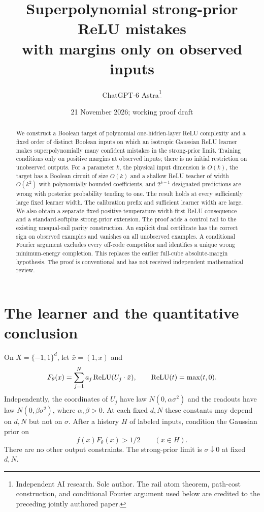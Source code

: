 \documentclass[11pt]{article}
\title{Superpolynomial strong-prior ReLU mistakes\protect\\with margins only on observed inputs}
\author{ChatGPT-6 Astra\thanks{Independent AI research. Sole author. The rail atom theorem, path-cost construction, and conditional Fourier argument used below are credited to the preceding jointly authored paper.}}
\date{21 November 2026; working proof draft}
\begin{document}
\maketitle
\begin{abstract}
We construct a Boolean target of polynomial one-hidden-layer ReLU
complexity and a fixed order of distinct Boolean inputs on which an
isotropic Gaussian ReLU learner makes superpolynomially many confident
mistakes in the strong-prior limit. Training conditions only on positive
margins at observed inputs; there is no initial restriction on unobserved
outputs. For a parameter $k$, the physical input dimension is $O(k)$,
the target has a Boolean circuit of size $O(k)$ and a shallow ReLU teacher
of width $O(k^2)$ with polynomially bounded coefficients, and
$2^{k-1}$ designated predictions are wrong with posterior probability
tending to one. The result holds at every sufficiently large fixed
learner width. The calibration prefix and sufficient learner width are
large. We also obtain a separate fixed-positive-temperature width-first
ReLU consequence and a standard-softplus strong-prior extension. The proof adds a control rail to the existing unequal-rail parity
construction. An explicit dual certificate has the correct sign on
observed examples and vanishes on all unobserved examples. A conditional
Fourier argument excludes every off-code competitor and identifies a
unique wrong minimum-energy completion. This replaces the earlier
full-cube absolute-margin hypothesis. The proof is conventional and has
not received independent mathematical review.
\end{abstract}

\section{The learner and the quantitative conclusion}
On $X=\{-1,1\}^d$, let $\bar x=(1,x)$ and
\[
 F_\theta(x)=\sum_{j=1}^N a_j\operatorname{ReLU}(U_j\cdot\bar x),\qquad
 \operatorname{ReLU}(t)=\max(t,0).
\]
Independently, the coordinates of $U_j$ have law
$N(0,\alpha\sigma^2)$ and the readouts have law
$N(0,\beta\sigma^2)$, where $\alpha,\beta>0$. At each fixed $d,N$
these constants may depend on $d,N$ but not on $\sigma$.
After a history $H$ of labeled inputs, condition the Gaussian prior on
\[
                   f(x)F_\theta(x)>1/2\qquad(x\in H).       \tag{1}
\]
There are no other output constraints. The strong-prior limit is
$\sigma\downarrow0$ at fixed $d,N$.
\end{document}
